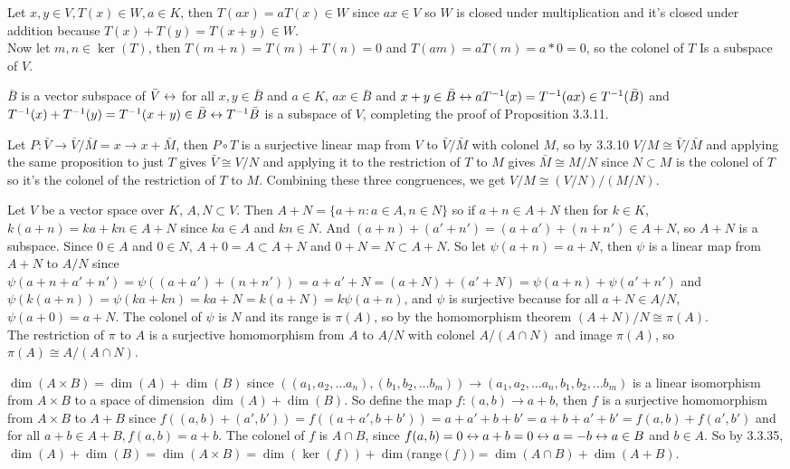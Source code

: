 \documentclass[11pt, oneside]{article}   	%
\begin{document}
\item Let $x, y \in V, T(x) \in W, a\in K$, then $T(ax) = aT(x) \in W$ since $ax \in V$ so $W$ is closed under multiplication and it's closed under addition because $T(x) + T(y) = T(x + y) \in W$. \\
Now let $m, n\in \ker(T)$, then $T(m + n) = T(m) + T(n) = 0$ and $T(am) = aT(m) = a * 0 = 0$, so the colonel of $T$ Is a subspace of $V$. 
\item $\bar{B}$ is a vector subspace of $\bar{V} \leftrightarrow$ for all $x, y \in \bar{B}$ and $a \in K$, $ax \in \bar{B} $ and $x + y \in \bar{B} \leftrightarrow aT^{-1}(x) = T^{-1}(ax) \in T^{-1}(\bar{B})$ and $T^{-1}(x) + T^{-1}(y) = T^{-1}(x + y) \in \bar{B} \leftrightarrow T^{-1}\bar{B}$ is a subspace of $V$, completing the proof of Proposition 3.3.11. 
\item Let $P: \bar{V} \to \bar{V}/\bar{M} = x\to x + \bar{M}$, then $P \circ T$ is a surjective linear map from $V$ to $\bar{V} / \bar{M}$ with colonel $M$, so by 3.3.10 $V / M \cong \bar{V} / \bar{M}$ and applying the same proposition to just $T$ gives $\bar{V} \cong V / N$ and applying it to the restriction of $T$ to $M$ gives $\bar{M} \cong M / N$ since $N \subset M$ is the colonel of $T$ so it's the colonel of the restriction of $T$ to $M$. Combining these three congruences, we get $V / M \cong (V / N) / (M / N)$.
\item Let $V$ be a vector space over $K$, $A, N \subset V$. Then $A + N = \{a + n : a \in A, n \in N\}$ so if $a + n \in A + N$ then for $k \in K$, $k(a + n) = ka + kn \in A + N$ since $ka \in A$ and $kn \in N$. And $(a + n) + (a' + n') = (a + a') + (n + n') \in A + N$, so $A + N$ is a subspace. Since $0 \in A$ and $0 \in N$, $A + 0 = A \subset A + N$ and $0 + N = N \subset A + N$. So let $\psi(a + n) = a + N$, then $\psi$ is a linear map from $A + N$ to $A/N$ since $\psi(a + n + a' + n') = \psi((a + a') + (n + n')) = a + a' + N = (a + N) + (a' + N) = \psi(a + n) + \psi(a' + n')$ and $\psi(k(a + n)) = \psi(ka + kn) = ka + N = k(a + N) = k\psi(a + n)$, and $\psi$ is surjective because for all $a + N \in A / N$, $\psi(a + 0) = a + N$. The colonel of $\psi$ is $N$ and its range is $\pi(A)$, so by the homomorphism theorem $(A + N) / N \cong \pi(A)$. \\
The restriction of $\pi$ to $A$ is a surjective homomorphism from $A$ to $A / N$ with colonel $A / (A \cap N)$ and image $\pi(A)$, so $\pi(A) \cong A / (A \cap N)$.
\item $\dim(A \times B) = \dim(A) + \dim(B)$ since $((a_1, a_2, \ldots a_n), (b_1, b_2, \ldots b_m)) \to (a_1, a_2, \ldots a_n, b_1, b_2, \ldots b_m)$ is a linear isomorphism from $A \times B$ to a space of dimension $\dim(A) + \dim(B)$. So define the map $f: (a, b) \to a + b$, then $f$ is a surjective homomorphism from $A \times B$ to $A + B$ since $f((a, b) + (a', b')) = f((a + a', b + b')) = a + a' + b + b' = a + b + a' + b' = f(a, b) + f(a', b')$ and for all $a+b \in A + B, f(a, b) = a + b$. The colonel of $f$ is $A\cap B$, since $f(a, b) = 0 \leftrightarrow a + b = 0 \leftrightarrow a = -b \leftrightarrow a \in B$ and $b \in A$. So by 3.3.35, $\dim(A) + \dim(B) = \dim(A \times B) = \dim(\ker(f)) + \dim($range$(f)) = \dim(A \cap B) + \dim(A + B)$. 
\end{document}
